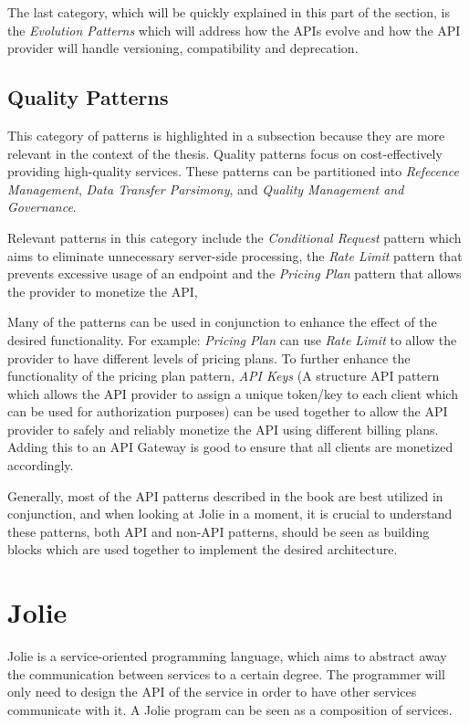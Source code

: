 The last category, which will be quickly explained in this part of the section, is the \textit{Evolution Patterns} which will address how the APIs evolve and how the API provider will handle versioning, compatibility and deprecation.

\subsection{Quality Patterns}
This category of patterns is highlighted in a subsection because they are more relevant in the context of the thesis. 
Quality patterns focus on cost-effectively providing high-quality services. These patterns can be partitioned into \textit{Refecence Management}, \textit{Data Transfer Parsimony}, and \textit{Quality Management and Governance}.

Relevant patterns in this category include the \textit{Conditional Request} pattern which aims to eliminate unnecessary server-side 
processing, the \textit{Rate Limit} pattern that prevents excessive usage of an endpoint and the \textit{Pricing Plan} pattern that allows the provider to monetize the API,

Many of the patterns can be used in conjunction to enhance the effect of the desired functionality. For example: \textit{Pricing Plan} can use \textit{Rate Limit} to allow the provider to have different levels of pricing plans.
To further enhance the functionality of the pricing plan pattern, \textit{API Keys} (A structure API pattern which allows the API provider
to assign a unique token/key to each client which can be used for authorization purposes) can be used together to allow the API provider to safely and reliably monetize the API using different billing plans. 
Adding this to an API Gateway is good to ensure that all clients are monetized accordingly.

Generally, most of the API patterns described in the book are best utilized in conjunction,
and when looking at Jolie in a moment, it is crucial to understand these patterns, both API and non-API patterns,
should be seen as building blocks which are used together to implement the desired architecture.

\section{Jolie}
Jolie is a service-oriented programming language, which aims to abstract away the communication between services to a certain degree.
The programmer will only need to design the API of the service in order to have other services communicate with it.
A Jolie program can be seen as a composition of services.

